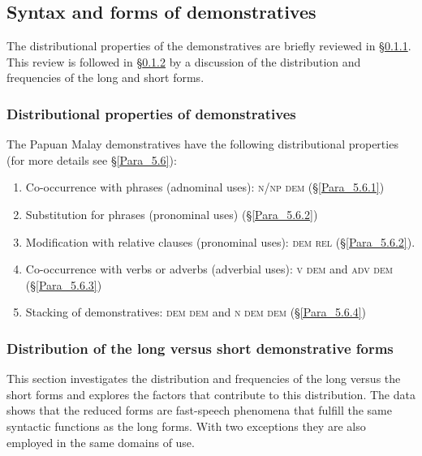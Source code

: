 \subsection{Syntax and forms of demonstratives}
\label{Para_7.1.1}
The distributional properties of the demonstratives are briefly reviewed in §\ref{Para_7.1.1.1}. This review is followed in §\ref{Para_7.1.1.2} by a discussion of the distribution and frequencies of the long and short  forms.


\subsubsection[Distributional properties of demonstratives]{Distributional properties of demonstratives}
\label{Para_7.1.1.1}
The Papuan Malay demonstratives have the following distributional properties (for more details see §\ref{Para_5.6}):


\begin{enumerate}
\item 
Co-occurrence with  phrases (adnominal uses): \textsc{n}/\textsc{np} \textsc{dem} (§\ref{Para_5.6.1})
\item 
Substitution for  phrases (pronominal uses) (§\ref{Para_5.6.2})
\item 
Modification with relative clauses (pronominal uses): \textsc{dem rel} (§\ref{Para_5.6.2}).
\item 
Co-occurrence with verbs or adverbs (adverbial uses): \textsc{v dem} and \textsc{adv dem} (§\ref{Para_5.6.3})
\item 
Stacking of demonstratives: \textsc{dem} \textsc{dem} and \textsc{n} \textsc{dem} \textsc{dem} (§\ref{Para_5.6.4})

\end{enumerate}
\subsubsection[Distribution of the long versus short {demonstrative} forms]{Distribution of the long versus short {demonstrative} forms}
\label{Para_7.1.1.2}
This section investigates the distribution and frequencies of the long versus the short  forms and explores the factors that contribute to this distribution. The data shows that the reduced  forms are fast-speech phenomena that fulfill the same syntactic functions as the long forms. With two exceptions they are also employed in the same domains of use.



